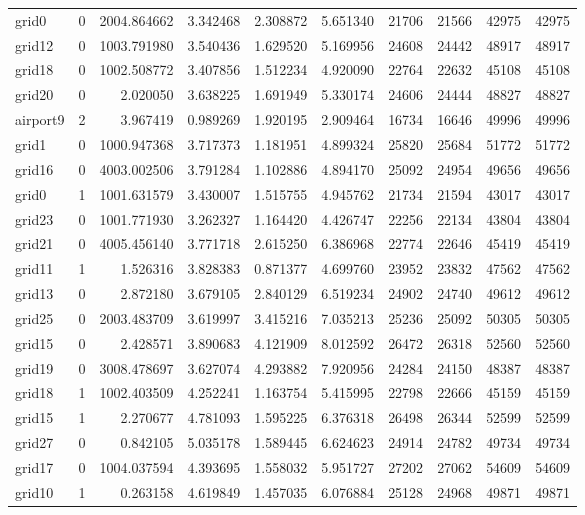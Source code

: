 \begin{longtable}{|l|r|r|r|r|r|r|r|r|r|}
grid0 & 0 & 2004.864662 & 3.342468 & 2.308872 & 5.651340 & 21706 & 21566 & 42975 & 42975 \\
grid12 & 0 & 1003.791980 & 3.540436 & 1.629520 & 5.169956 & 24608 & 24442 & 48917 & 48917 \\
grid18 & 0 & 1002.508772 & 3.407856 & 1.512234 & 4.920090 & 22764 & 22632 & 45108 & 45108 \\
grid20 & 0 & 2.020050 & 3.638225 & 1.691949 & 5.330174 & 24606 & 24444 & 48827 & 48827 \\
airport9 & 2 & 3.967419 & 0.989269 & 1.920195 & 2.909464 & 16734 & 16646 & 49996 & 49996 \\
grid1 & 0 & 1000.947368 & 3.717373 & 1.181951 & 4.899324 & 25820 & 25684 & 51772 & 51772 \\
grid16 & 0 & 4003.002506 & 3.791284 & 1.102886 & 4.894170 & 25092 & 24954 & 49656 & 49656 \\
grid0 & 1 & 1001.631579 & 3.430007 & 1.515755 & 4.945762 & 21734 & 21594 & 43017 & 43017 \\
grid23 & 0 & 1001.771930 & 3.262327 & 1.164420 & 4.426747 & 22256 & 22134 & 43804 & 43804 \\
grid21 & 0 & 4005.456140 & 3.771718 & 2.615250 & 6.386968 & 22774 & 22646 & 45419 & 45419 \\
grid11 & 1 & 1.526316 & 3.828383 & 0.871377 & 4.699760 & 23952 & 23832 & 47562 & 47562 \\
grid13 & 0 & 2.872180 & 3.679105 & 2.840129 & 6.519234 & 24902 & 24740 & 49612 & 49612 \\
grid25 & 0 & 2003.483709 & 3.619997 & 3.415216 & 7.035213 & 25236 & 25092 & 50305 & 50305 \\
grid15 & 0 & 2.428571 & 3.890683 & 4.121909 & 8.012592 & 26472 & 26318 & 52560 & 52560 \\
grid19 & 0 & 3008.478697 & 3.627074 & 4.293882 & 7.920956 & 24284 & 24150 & 48387 & 48387 \\
grid18 & 1 & 1002.403509 & 4.252241 & 1.163754 & 5.415995 & 22798 & 22666 & 45159 & 45159 \\
grid15 & 1 & 2.270677 & 4.781093 & 1.595225 & 6.376318 & 26498 & 26344 & 52599 & 52599 \\
grid27 & 0 & 0.842105 & 5.035178 & 1.589445 & 6.624623 & 24914 & 24782 & 49734 & 49734 \\
grid17 & 0 & 1004.037594 & 4.393695 & 1.558032 & 5.951727 & 27202 & 27062 & 54609 & 54609 \\
grid10 & 1 & 0.263158 & 4.619849 & 1.457035 & 6.076884 & 25128 & 24968 & 49871 & 49871 \\

\end{longtable}
